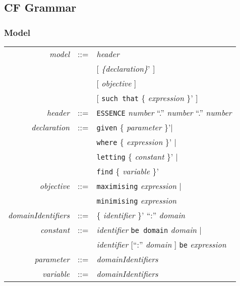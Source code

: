 \documentclass{article}
\begin{document}
\subsection{CF Grammar}

\subsubsection{Model}
\begin{tabular}{rcl}

\textit{model} & ::= & \textit{header}\\
               &     & [ \textit{ \{declaration\}}' ] \\
               &     & [ \textit{objective} ] \\
               &     & [ \texttt{such that} \{ \textit{expression} \}' ] \\

 \textit{header}& ::= & \texttt{ESSENCE} \textit{number} ``.'' \textit{number} ``.'' \textit{number} \\

\textit{declaration} & ::= & \texttt{given} \{ \textit{parameter} \}'$\mid$ \\
                     &     & \texttt{where} \{ \textit{expression} \}' $\mid$ \\
                     &     & \texttt{letting} \{ \textit{constant} \}' $\mid$\\
                     &     & \texttt{find} \{ \textit{variable} \}'\\

\textit{objective} & ::= & \texttt{maximising} \textit{expression} $\mid$ \\
                   &     & \texttt{minimising} \textit{expression} \\

\textit{domainIdentifiers} & ::= & \{ \textit{identifier} \}' ``:'' \textit{domain} \\

\textit{constant}  & ::=  & \textit{identifier}  \texttt{be domain} \textit{domain} $\mid$ \\
                           & & \textit{identifier} [``:'' \textit{domain} ] \texttt{be} \textit{expression} \\
\textit{parameter} & ::= & \textit{domainIdentifiers} \\
\textit{variable}  & ::= & \textit{domainIdentifiers}\\ 

\end{tabular}
\end{document}
